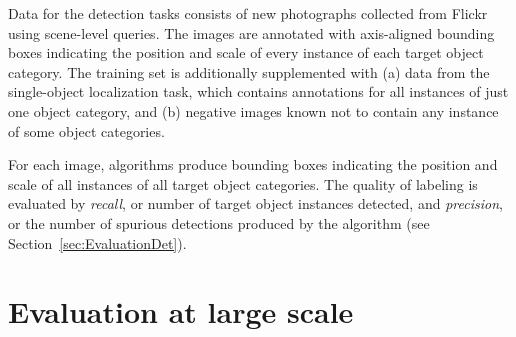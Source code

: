 Data for the detection tasks consists of new photographs collected from Flickr using scene-level queries. The images
are annotated with axis-aligned bounding boxes indicating the position and scale of every instance of each target object category. 
The training set is additionally supplemented with (a) data from the single-object localization task, which contains annotations
for all instances of  just one object category, and (b) negative images known not to contain any instance of some object categories.

For each image, algorithms produce bounding boxes indicating the position and scale of all instances of all target
object categories. The quality of labeling is evaluated by \emph{recall}, or number of target object instances detected, and
\emph{precision}, or the number of spurious detections produced by the algorithm (see Section~\ref{sec:EvaluationDet}).





\section{Evaluation at large scale}
\label{sec:Evaluation}


